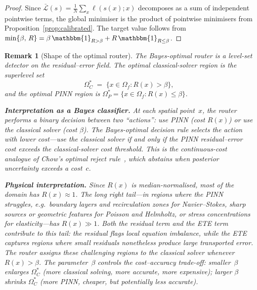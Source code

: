 \documentclass[11pt]{article}
\newtheorem{remark}[theorem]{Remark}
\newcommand{\Lcal}{\mathcal{L}}
\newcommand{\ind}{\mathbbm{1}}
\begin{document}
\begin{proof}
Since $\bar{\Lcal}(s) = \frac{1}{N}\sum_x \ell(s(x); x)$ decomposes as a sum of
independent pointwise terms, the global minimiser is the product of pointwise
minimisers from Proposition~\ref{prop:calibrated}.  The target value follows from
$\min\{\beta,\,R\} = \beta\,\ind_{R > \beta} + R\,\ind_{R \le \beta}$.
\end{proof}

\begin{remark}[Shape of the optimal router]\label{rem:shape}
The Bayes-optimal router is a \emph{level-set detector} on the residual--error
field.  The optimal classical-solver region is the superlevel set
\begin{equation}\label{eq:optimal-cfd}
  \Omega_C^* \;=\; \bigl\{x \in \Omega_f : R(x) > \beta\bigr\},
\end{equation}
and the optimal PINN region is
$\Omega_P^* = \{x \in \Omega_f : R(x) \le \beta\}$.

\textbf{Interpretation as a Bayes classifier.}
At each spatial point~$x$, the router performs a binary decision between two
``actions'': use PINN (cost $R(x)$) or use the classical solver (cost $\beta$).
The Bayes-optimal decision rule selects the action with lower cost---use the
classical solver if and only if the PINN residual--error cost exceeds the
classical-solver cost threshold.  This is the continuous-cost analogue of
Chow's optimal reject rule~\cite{chow1970optimum}, which abstains when posterior
uncertainty exceeds a cost~$c$.

\textbf{Physical interpretation.}
Since $R(x)$ is median-normalised, most of the domain has $R(x) \approx 1$.  The
long right tail---in regions where the PINN struggles, e.g.\ boundary layers and
recirculation zones for Navier--Stokes, sharp sources or geometric features for
Poisson and Helmholtz, or stress concentrations for elasticity---has $R(x) \gg 1$.
Both the residual term and the ETE term contribute to this tail: the residual
flags local equation imbalance, while the ETE captures regions where small
residuals nonetheless produce large transported error.  The router assigns these
challenging regions to the classical solver whenever $R(x) > \beta$.  The
parameter~$\beta$ controls the cost--accuracy trade-off: smaller~$\beta$ enlarges
$\Omega_C^*$ (more classical solving, more accurate, more expensive); larger
$\beta$ shrinks $\Omega_C^*$ (more PINN, cheaper, but potentially less accurate).
\end{remark}
\end{document}
